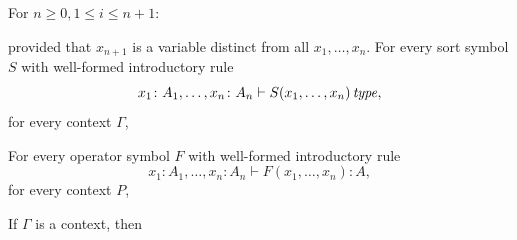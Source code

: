 \begin{enumerate}
     For $n \geq 0, 1 \leq i \leq n+1$: \begin{mathpar}
        \end{mathpar}
        provided that $x_{n+1}$ is a variable distinct from all $x_1, \dots, x_n$.
     For every sort symbol $S$ with well-formed introductory rule \[
            x_1 \colon A_1, \dots, x_n \colon A_n 
            \vdash
            S(x_1, \dots, x_n) \operatorname{\mathit{\space type}},
        \] for every context $\Gamma$, \begin{mathpar}
        \end{mathpar}
     For every operator symbol $F$ with well-formed introductory rule \[
            x_1 \colon A_1, \dots, x_n \colon A_n 
            \vdash
            F(x_1, \dots, x_n) \colon A,
        \] for every context $P$, \begin{mathpar}
        \end{mathpar}
     If $\Gamma$ is a context, then \begin{mathpar}
\end{mathpar}
\end{enumerate}
